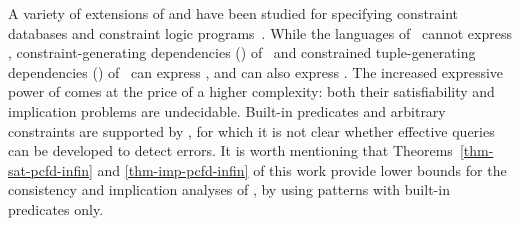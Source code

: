 A variety of extensions of \FDs and \INDs have been studied for
specifying constraint databases and constraint logic
programs~\cite{BCW99,BP83,Maher97,MS96}. While the languages
of~\cite{BCW99,Maher97} cannot express \CFDs,
constraint-generating dependencies (\CGDs)
of~\cite{BCW99} and constrained tuple-generating dependencies
(\CTGDs) of~\cite{MS96} can express \pCFDs,
and \CTGDs can also express \pCINDs. The increased expressive
power of \CTGDs comes at the price of a higher complexity:
both their satisfiability and implication problems are undecidable.
Built-in predicates and arbitrary constraints are supported
by \CGDs, for which it is not clear whether effective \SQL
queries can be developed to detect errors. It is worth mentioning
that Theorems~\ref{thm-sat-pcfd-infin} and \ref{thm-imp-pcfd-infin}
of this work provide lower bounds for the consistency and implication analyses
of \CGDs, by using patterns with built-in predicates only.


